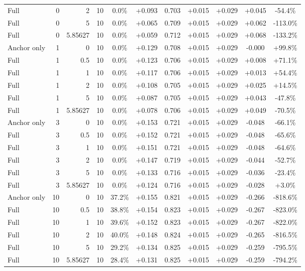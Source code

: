 \begin{table}[htbp]
\begin{tabular}{lrrrccccccc}
Full & 0 & 2 & 10 & 0.0\% & +0.093 & 0.703 & +0.015 & +0.029 & +0.045 & -54.4\% \\
Full & 0 & 5 & 10 & 0.0\% & +0.065 & 0.709 & +0.015 & +0.029 & +0.062 & -113.0\% \\
Full & 0 & 5.85627 & 10 & 0.0\% & +0.059 & 0.712 & +0.015 & +0.029 & +0.068 & -133.2\% \\
Anchor only & 1 & 0 & 10 & 0.0\% & +0.129 & 0.708 & +0.015 & +0.029 & -0.000 & +99.8\% \\
Full & 1 & 0.5 & 10 & 0.0\% & +0.123 & 0.706 & +0.015 & +0.029 & +0.008 & +71.1\% \\
Full & 1 & 1 & 10 & 0.0\% & +0.117 & 0.706 & +0.015 & +0.029 & +0.013 & +54.4\% \\
Full & 1 & 2 & 10 & 0.0\% & +0.108 & 0.705 & +0.015 & +0.029 & +0.025 & +14.5\% \\
Full & 1 & 5 & 10 & 0.0\% & +0.087 & 0.705 & +0.015 & +0.029 & +0.043 & -47.8\% \\
Full & 1 & 5.85627 & 10 & 0.0\% & +0.078 & 0.706 & +0.015 & +0.029 & +0.049 & -70.5\% \\
Anchor only & 3 & 0 & 10 & 0.0\% & +0.153 & 0.721 & +0.015 & +0.029 & -0.048 & -66.1\% \\
Full & 3 & 0.5 & 10 & 0.0\% & +0.152 & 0.721 & +0.015 & +0.029 & -0.048 & -65.6\% \\
Full & 3 & 1 & 10 & 0.0\% & +0.151 & 0.721 & +0.015 & +0.029 & -0.048 & -64.6\% \\
Full & 3 & 2 & 10 & 0.0\% & +0.147 & 0.719 & +0.015 & +0.029 & -0.044 & -52.7\% \\
Full & 3 & 5 & 10 & 0.0\% & +0.133 & 0.716 & +0.015 & +0.029 & -0.036 & -23.4\% \\
Full & 3 & 5.85627 & 10 & 0.0\% & +0.124 & 0.716 & +0.015 & +0.029 & -0.028 & +3.0\% \\
Anchor only & 10 & 0 & 10 & 37.2\% & +0.155 & 0.821 & +0.015 & +0.029 & -0.266 & -818.6\% \\
Full & 10 & 0.5 & 10 & 38.8\% & +0.154 & 0.823 & +0.015 & +0.029 & -0.267 & -823.0\% \\
Full & 10 & 1 & 10 & 39.6\% & +0.152 & 0.823 & +0.015 & +0.029 & -0.267 & -822.0\% \\
Full & 10 & 2 & 10 & 40.0\% & +0.148 & 0.824 & +0.015 & +0.029 & -0.265 & -816.5\% \\
Full & 10 & 5 & 10 & 29.2\% & +0.134 & 0.825 & +0.015 & +0.029 & -0.259 & -795.5\% \\
Full & 10 & 5.85627 & 10 & 28.4\% & +0.131 & 0.825 & +0.015 & +0.029 & -0.259 & -794.2\% \\

\end{tabular}
\end{table}
